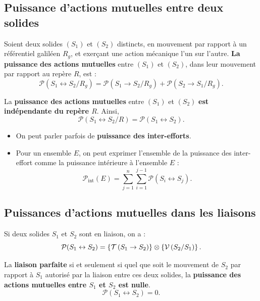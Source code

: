\documentclass[10pt,fleqn]{article} %
\begin{document}
\subsection{Puissance d'actions mutuelles entre deux solides}


\begin{defi}
Soient deux solides $(S_1)$ et $(S_2)$ distincts, en mouvement par rapport à un référentiel galiléen $R_g$, et exerçant une action mécanique l'un sur l'autre.
\textbf{La puissance} \textbf{des actions mutuelles} entre $(S_1)$ et $(S_2)$, dans leur mouvement par rapport au repère $R$, est :
$$
\mathcal{P}(S_1 \leftrightarrow S_2/R_g)=\mathcal{P}(S_1 \rightarrow S_2/R_g)+\mathcal{P}(S_2 \rightarrow S_1/R_g).
$$		
 

La \textbf{puissance des actions mutuelles} entre $(S_1)$ et $(S_2)$ \textbf{est indépendante du repère $R$}.
Ainsi,
$$\mathcal{P}(S_1 \leftrightarrow S_2/R)=\mathcal{P}(S_1 \leftrightarrow S_2).
$$
\end{defi}


\begin{rem}%
\begin{itemize}
\item On peut parler parfois de \textbf{puissance des inter-efforts}.
\item Pour un ensemble $E$, on peut exprimer l'ensemble de la puissance des inter-effort comme la puissance intérieure à l'ensemble $E$ : 
$$
\mathcal{P}_{\text{int}}(E)=\displaystyle{\sum^n_{j=1}}\displaystyle{\sum^{j-1}_{i=1}}\mathcal{P}(S_i \leftrightarrow S_j).
$$
\end{itemize}

\end{rem}%


\subsection{Puissances d'actions mutuelles dans les liaisons}
\begin{defi}
Si deux solides $S_1$ et $S_2$ sont en liaison, on a :
$$
\mathcal{P}(S_1 \leftrightarrow S_2) = \left\{\mathcal{T} \left(S_1\rightarrow S_2 \right) \right\}\otimes \left\{\mathcal{V} \left(S_2/S_1 \right) \right\}.
$$

La \textbf{liaison parfaite} si et seulement si quel que soit le mouvement de $S_2$ par rapport à $S_1$ autorisé par la liaison entre ces deux solides, la \textbf{puissance des actions mutuelles entre $S_1$ et $S_2$ est nulle}.
$$
\mathcal{P}(S_1 \leftrightarrow S_2)=0.
$$
\end{defi}
\end{document}
